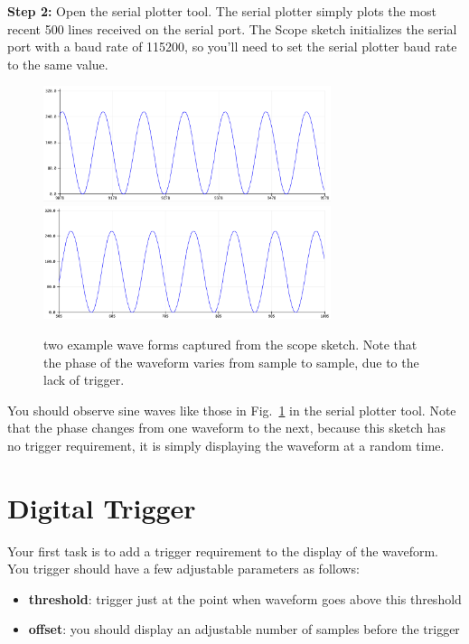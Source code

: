 \documentclass[12pt]{article}
\begin{document}
\noindent
{\bf Step 2:}  Open the serial plotter tool.  The serial plotter simply plots the most recent 500 lines received on the serial port.  The Scope sketch initializes the serial port with a baud rate of 115200, so you'll need to set the serial plotter baud rate to the same value. \\

\begin{figure}[htbp]
\begin{center}
{\includegraphics[width=0.75\textwidth]{figs/tracea.png}}
{\includegraphics[width=0.75\textwidth]{figs/traceb.png}}
\end{center}
\caption{\label{fig:traces} two example wave forms captured from the {\rm scope}  sketch.  Note that the phase of the waveform varies from sample to sample, due to the lack of trigger.}
\end{figure}

You should observe sine waves like those in Fig.~\ref{fig:traces} in the serial plotter tool.  Note that the phase changes from one waveform to the next, because this sketch has no trigger requirement, it is simply displaying the waveform at a random time.

\section{Digital Trigger}

Your first task is to add a trigger requirement to the display of the waveform.  You trigger should have a few adjustable parameters as follows:
\begin{itemize}
 \item {\bf threshold}:  trigger just at the point when waveform goes above this threshold
 \item {\bf offset}:  you should display an adjustable number of samples before the trigger
\end{itemize}
\end{document}
